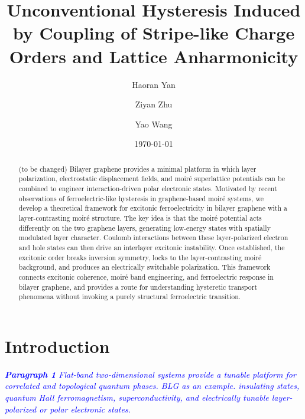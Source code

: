 \documentclass[aps,prx,article,twocolumn,amsmath,amssymb,superscriptaddress,longbibliography]{revtex4-2}
\begin{document}
\title{Unconventional Hysteresis Induced by Coupling of Stripe-like Charge Orders and Lattice Anharmonicity}
\author{Haoran Yan}
\author{Ziyan Zhu}
\author{Yao Wang}
\date{\today}

\begin{abstract}
(to be changed) Bilayer graphene provides a minimal platform in which layer polarization, electrostatic displacement fields, and moiré superlattice potentials can be combined to engineer interaction-driven polar electronic states. Motivated by recent observations of ferroelectric-like hysteresis in graphene-based moiré systems, we develop a theoretical framework for excitonic ferroelectricity in bilayer graphene with a layer-contrasting moiré structure. The key idea is that the moiré potential acts differently on the two graphene layers, generating low-energy states with spatially modulated layer character. Coulomb interactions between these layer-polarized electron and hole states can then drive an interlayer excitonic instability. Once established, the excitonic order breaks inversion symmetry, locks to the layer-contrasting moiré background, and produces an electrically switchable polarization. This framework connects excitonic coherence, moiré band engineering, and ferroelectric response in bilayer graphene, and provides a route for understanding hysteretic transport phenomena without invoking a purely structural ferroelectric transition.
\end{abstract}

\maketitle

\section{Introduction}

\textcolor{blue}{\itshape \textbf{Paragraph 1}
Flat-band two-dimensional systems provide a tunable platform for correlated and topological quantum phases. BLG as an example. insulating states, quantum Hall ferromagnetism, superconductivity, and electrically tunable layer-polarized or polar electronic states.}
\end{document}
